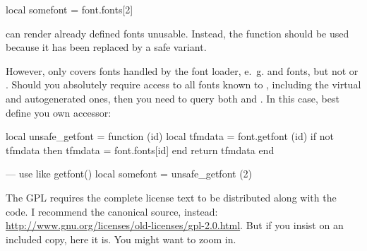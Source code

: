 \beginlisting
    local somefont = font.fonts[2]
\endlisting

\noindent can render already defined fonts unusable.
%
Instead, the function  should be used
because it has been replaced by a safe variant.

However,  only covers fonts handled by the
font loader, e.~g.  and 
fonts, but not  or .
%
Should you absolutely require access to all fonts known to \LUATEX,
including the virtual and autogenerated ones, then you need to query
both  and .
%
In this case, best define you own accessor:

\beginlisting
    local unsafe_getfont = function (id)
        local tfmdata = font.getfont (id)
        if not tfmdata then
            tfmdata = font.fonts[id]
        end
        return tfmdata
    end

    --- use like getfont()
    local somefont = unsafe_getfont (2)
\endlisting

\endsubsection
\endsection

\clearpage

The GPL requires the complete license text to be distributed along
with the code. I recommend the canonical source, instead:
\url{http://www.gnu.org/licenses/old-licenses/gpl-2.0.html}.
But if you insist on an included copy, here it is.
You might want to zoom in.

